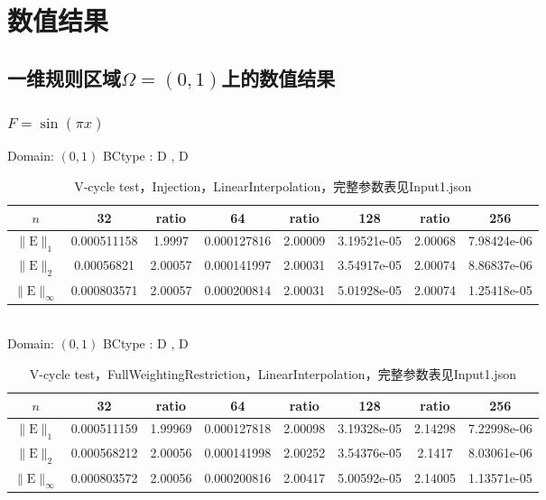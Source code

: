 \documentclass[a4paper,twoside]{ctexart}
\begin{document}
\section{数值结果}
\subsection{一维规则区域$\Omega=(0,1)$上的数值结果}
\subsubsection{$F = \sin(\pi x)$}
\noindent Domain: $(0,1)$
BCtype : D , D
\begin{table}[htbp]
\centering\begin{tabular}{c|ccccccc}
\hline
$n$&32&ratio&64&ratio&128&ratio&256\\
\hline
$\|\mathrm{E}\|_1$&0.000511158&1.9997&0.000127816&2.00009&3.19521e-05&2.00068&7.98424e-06\\
\hline
$\|\mathrm{E}\|_2$&0.00056821&2.00057&0.000141997&2.00031&3.54917e-05&2.00074&8.86837e-06\\
\hline
$\|\mathrm{E}\|_{\infty}$&0.000803571&2.00057&0.000200814&2.00031&5.01928e-05&2.00074&1.25418e-05\\
\hline
\end{tabular}
\caption{V-cycle test，Injection，LinearInterpolation，完整参数表见Input1.json}
\end{table}\\

\noindent Domain: $(0,1)$
BCtype : D , D
\begin{table}[htbp]
\centering\begin{tabular}{c|ccccccc}
\hline
$n$&32&ratio&64&ratio&128&ratio&256\\
\hline
$\|\mathrm{E}\|_1$&0.000511159&1.99969&0.000127818&2.00098&3.19328e-05&2.14298&7.22998e-06\\
\hline
$\|\mathrm{E}\|_2$&0.000568212&2.00056&0.000141998&2.00252&3.54376e-05&2.1417&8.03061e-06\\
\hline
$\|\mathrm{E}\|_{\infty}$&0.000803572&2.00056&0.000200816&2.00417&5.00592e-05&2.14005&1.13571e-05\\
\hline
\end{tabular}
\caption{V-cycle test，FullWeightingRestriction，LinearInterpolation，完整参数表见Input1.json}
\end{table}\\
\end{document}
